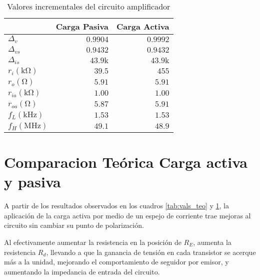 \begin{table}[htt]
    \centering
    \begin{tabular}{|l|r|r|}
        \hline
         & \multicolumn{1}{c|}{Carga Pasiva} & \multicolumn{1}{c|}{Carga Activa} \\ \hline
        $\Delta_{v}$    & $0.9904$        & $0.9992$ \\
        $\Delta_{vs}$   & $0.9432$        & $0.9432$ \\ 
        $\Delta_{is}$   & $43.9\si{\kilo}$& $43.9\si{\kilo}$ \\ 
        $r_{i}(\si{\kilo\ohm})$ & $39.5$ & $455$ \\ 
        $r_{o}(\si{\ohm})$      & $5.91$ & $5.91$ \\
        $r_{ia}(\si{\kilo\ohm})$ & $1.00$ & $1.00$ \\ 
        $r_{oa}(\si{\ohm})$      & $5.87$ & $5.91$ \\
        $f_L(\si{\kilo\hertz})$  & $1.53$ & $1.53$  \\
        $f_H(\si{\mega\hertz})$  & $49.1$ & $48.9$  \\ \hline
    \end{tabular}
    \caption{Valores incrementales del circuito amplificador}
    \label{tab:vals_teo_sys}
\end{table}

\section{Comparacion Teórica Carga activa y pasiva}

A partir de los resultados observados en los cuadros \ref{tab:vals_teo} y \ref{tab:vals_teo_sys}, la aplicación de la carga activa por medio de un espejo de corriente trae mejoras al circuito sin cambiar su punto de polarización.

Al efectivamente aumentar la resistencia en la posición de $R_E$, aumenta la resistencia $R_d$, llevando a que la ganancia de tensión en cada transistor se acerque más a la unidad, mejorando el comportamiento de seguidor por emisor, y aumentando la impedancia de entrada del circuito.


